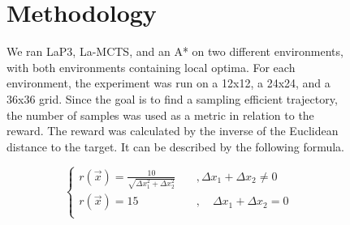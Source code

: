 \documentclass[bibliography=totoc]{scrartcl}
\begin{document}
\begin{figure}[H]
\section{Methodology}
We ran \ac{LaP3}, \ac{La-MCTS}, and an A* on two different environments, with both environments containing local optima.
For each environment, the experiment was run on a 12x12, a 24x24, and a 36x36 grid.
Since the goal is to find a sampling efficient trajectory, the number of samples was used as a metric in relation to the reward.
The reward was calculated by the inverse of the Euclidean distance to the target. It can be described by the following formula.


\begin{equation}
\left\{
\begin{array}{lll}
 r(\vec{x})=\frac{10}{\sqrt{\Delta x_1 ^2+\Delta x_2 ^2}}\quad&, \Delta x_1 + \Delta x_2 \neq 0\\
r(\vec{x})=15 &,\quad \Delta x_1 + \Delta x_2 =0\\
\end{array}
\right.
\end{equation}


\end{figure}
\end{document}
